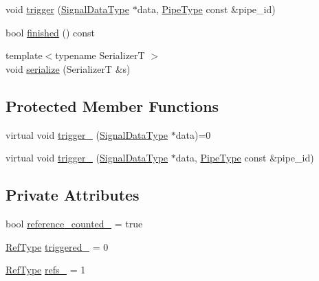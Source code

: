 \begin{DoxyCompactItemize}
void \hyperlink{structvt_1_1pipe_1_1callback_1_1_callback_base_ad54d116447acb7f1d051db946b2e875c}{trigger} (\hyperlink{structvt_1_1pipe_1_1callback_1_1_callback_base_aa1c1fd83b75220a50f6dcd7c1617726e}{Signal\+Data\+Type} $\ast$data, \hyperlink{namespacevt_ac9852acda74d1896f48f406cd72c7bd3}{Pipe\+Type} const \&pipe\+\_\+id)
\item 
bool \hyperlink{structvt_1_1pipe_1_1callback_1_1_callback_base_a20ed519d03b62560080ce3bdb8986f03}{finished} () const
\item 
{\footnotesize template$<$typename SerializerT $>$ }\\void \hyperlink{structvt_1_1pipe_1_1callback_1_1_callback_base_a4baca91fd4545ca13f34c75255209edd}{serialize} (SerializerT \&s)
\end{DoxyCompactItemize}
\subsection*{Protected Member Functions}
\begin{DoxyCompactItemize}
\item 
virtual void \hyperlink{structvt_1_1pipe_1_1callback_1_1_callback_base_a75a9b0103e0129f536385b10b86400c3}{trigger\+\_\+} (\hyperlink{structvt_1_1pipe_1_1callback_1_1_callback_base_aa1c1fd83b75220a50f6dcd7c1617726e}{Signal\+Data\+Type} $\ast$data)=0
\item 
virtual void \hyperlink{structvt_1_1pipe_1_1callback_1_1_callback_base_ac14c6c68a45c6f7e18c73daa45b23b83}{trigger\+\_\+} (\hyperlink{structvt_1_1pipe_1_1callback_1_1_callback_base_aa1c1fd83b75220a50f6dcd7c1617726e}{Signal\+Data\+Type} $\ast$data, \hyperlink{namespacevt_ac9852acda74d1896f48f406cd72c7bd3}{Pipe\+Type} const \&pipe\+\_\+id)
\end{DoxyCompactItemize}
\subsection*{Private Attributes}
\begin{DoxyCompactItemize}
\item 
bool \hyperlink{structvt_1_1pipe_1_1callback_1_1_callback_base_a5b996f1bdf68fe4ef90c8c1fe2241c59}{reference\+\_\+counted\+\_\+} = true
\item 
\hyperlink{namespacevt_a9b39ce9494bb04674d0d5b895a5aa50f}{Ref\+Type} \hyperlink{structvt_1_1pipe_1_1callback_1_1_callback_base_af5a2e880ab1ebf223e6f1372835a71a3}{triggered\+\_\+} = 0
\item 
\hyperlink{namespacevt_a9b39ce9494bb04674d0d5b895a5aa50f}{Ref\+Type} \hyperlink{structvt_1_1pipe_1_1callback_1_1_callback_base_aced0bdc19ac44bcb9f3ff3739e148143}{refs\+\_\+} = 1
\end{DoxyCompactItemize}


